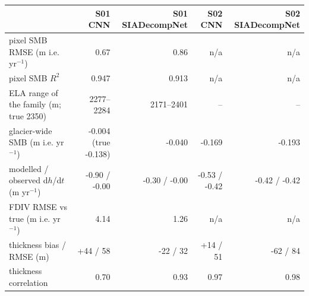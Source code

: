 \begin{tabular}{lrrrr}
\toprule
 & S01 CNN & S01 SIADecompNet & S02 CNN & S02 SIADecompNet \\
\midrule
pixel SMB RMSE (m i.e. yr$^{-1}$) & 0.67 & 0.86 & n/a & n/a \\
pixel SMB $R^2$ & 0.947 & 0.913 & n/a & n/a \\
ELA range of the family (m; true 2350) & 2277--2284 & 2171--2401 & -- & -- \\
glacier-wide SMB (m i.e. yr$^{-1}$) & -0.004 (true -0.138) & -0.040 & -0.169 & -0.193 \\
modelled / observed d$h$/d$t$ (m yr$^{-1}$) & -0.90 / -0.00 & -0.30 / -0.00 & -0.53 / -0.42 & -0.42 / -0.42 \\
FDIV RMSE vs true (m i.e. yr$^{-1}$) & 4.14 & 1.26 & n/a & n/a \\
thickness bias / RMSE (m) & +44 / 58 & -22 / 32 & +14 / 51 & -62 / 84 \\
thickness correlation & 0.70 & 0.93 & 0.97 & 0.98 \\
\bottomrule
\end{tabular}
